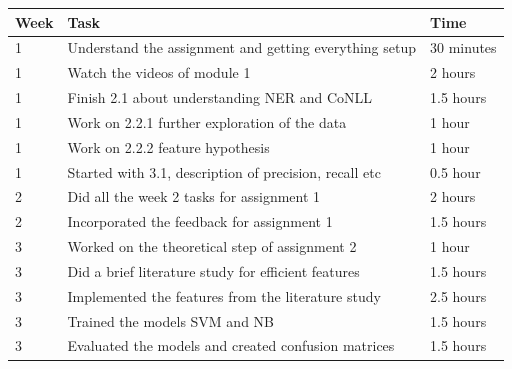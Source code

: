 \documentclass[11pt]{article}
\begin{document}
\begin{table}[!htb]
    \centering
    \small{
        \begin{tabular}{lll}
            \toprule
            Week  & Task                                                           & Time                                                  \\
            \midrule
            1     & Understand the assignment and getting everything setup         & 30 minutes                                            \\
            1     & Watch the videos of module 1                                   & 2 hours                                               \\
            1     & Finish 2.1 about understanding NER and CoNLL                   & 1.5 hours                                             \\
            1     & Work on 2.2.1 further exploration of the data                  & 1 hour                                                \\
            1     & Work on 2.2.2 feature hypothesis                               & 1 hour                                                \\
            1     & Started with 3.1, description of precision, recall etc         & 0.5 hour                                              \\
            2     & Did all the week 2 tasks for assignment 1                      & 2 hours                                               \\
            2     & Incorporated the feedback for assignment 1                     & 1.5 hours                                             \\
            3     & Worked on the theoretical step of assignment 2                 & 1 hour                                                \\
            3     & Did a brief literature study for efficient features            & 1.5 hours                                             \\
            3     & Implemented the features from the literature study             & 2.5 hours                                             \\
            3     & Trained the models SVM and NB                                  & 1.5 hours                                             \\
            3     & Evaluated the models and created confusion matrices            & 1.5 hours                                             \\

\end{tabular}}
\end{table}
\end{document}
